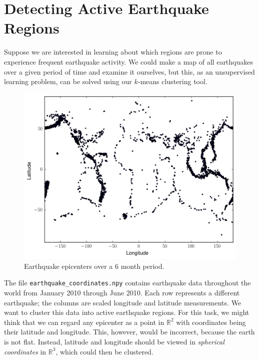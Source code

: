 \section*{Detecting Active Earthquake Regions} %

Suppose we are interested in learning about which regions are prone to experience frequent earthquake activity.
We could make a map of all earthquakes over a given period of time and examine it ourselves, but this, as an unsupervised learning problem, can be solved using our $k$-means clustering tool.

\begin{figure}[H]
    \centering
    \includegraphics[width=.7\textwidth]{figures/earthquakes.png}
    \caption{Earthquake epicenters over a 6 month period.}
    \label{fig:earthquakes}
\end{figure}

The file \texttt{earthquake\_coordinates.npy} contains earthquake data throughout the world from January 2010 through June 2010.
Each row represents a different earthquake; the columns are scaled longitude and latitude measurements.
We want to cluster this data into active earthquake regions.
For this task, we might think that we can regard any epicenter as a point in $\mathbb{R}^{2}$ with coordinates being their latitude and longitude.
This, however, would be incorrect, because the earth is not flat.
Instead, latitude and longitude should be viewed in \emph{spherical coordinates} in $\mathbb{R}^{3}$, which could then be clustered.

